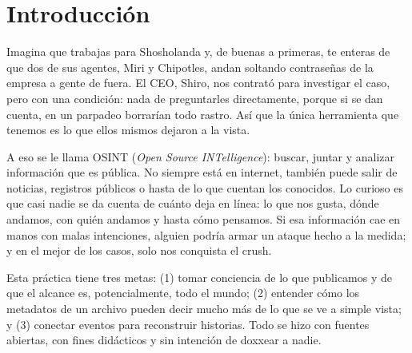 \section{Introducci\'on}

Imagina que trabajas para Shosholanda y, de buenas a primeras, te enteras de que dos de sus
agentes, Miri y Chipotles, andan soltando contrase\~nas de la empresa a gente de fuera.
El CEO, Shiro, nos contrat\'o para investigar el caso, pero con una condici\'on: nada de
preguntarles directamente, porque si se dan cuenta, en un parpadeo borrar\'ian todo rastro.
As\'i que la \'unica herramienta que tenemos es lo que ellos mismos dejaron a la vista.

A eso se le llama OSINT (\textit{Open Source INTelligence}): buscar, juntar y analizar informaci\'on
que es p\'ublica. No siempre est\'a en internet, tambi\'en puede salir de noticias, registros
p\'ublicos o hasta de lo que cuentan los conocidos. Lo curioso es que casi nadie se da cuenta
de cu\'anto deja en l\'inea: lo que nos gusta, d\'onde andamos, con qui\'en andamos y hasta
c\'omo pensamos. Si esa informaci\'on cae en manos con malas intenciones, alguien podr\'ia armar
un ataque hecho a la medida; y en el mejor de los casos, solo nos conquista el crush.

Esta pr\'actica tiene tres metas: (1) tomar conciencia de lo que publicamos y de que el alcance
es, potencialmente, todo el mundo; (2) entender c\'omo los metadatos de un archivo pueden decir
mucho m\'as de lo que se ve a simple vista; y (3) conectar eventos para reconstruir historias.
Todo se hizo con fuentes abiertas, con fines did\'acticos y sin intenci\'on de doxxear a nadie.
